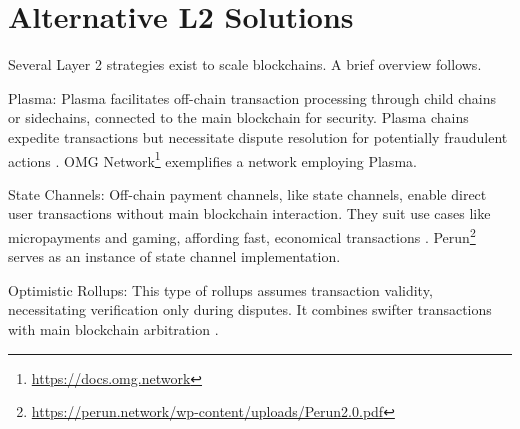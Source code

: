 \section{Alternative L2 Solutions}
Several Layer 2 strategies exist to scale blockchains. A brief overview follows.

Plasma: Plasma facilitates off-chain transaction processing through child chains or sidechains, connected to the main blockchain for security. Plasma chains expedite transactions but necessitate dispute resolution for potentially fraudulent actions \cite{thibault_blockchain_2022}. OMG Network\footnote{\url{https://docs.omg.network}} exemplifies a network employing Plasma.

State Channels: Off-chain payment channels, like state channels, enable direct user transactions without main blockchain interaction. They suit use cases like micropayments and gaming, affording fast, economical transactions \cite{negka_blockchain_2021}. Perun\footnote{\url{https://perun.network/wp-content/uploads/Perun2.0.pdf}} serves as an instance of state channel implementation.

Optimistic Rollups: This type of rollups assumes transaction validity, necessitating verification only during disputes. It combines swifter transactions with main blockchain arbitration \cite{thibault_blockchain_2022}.
